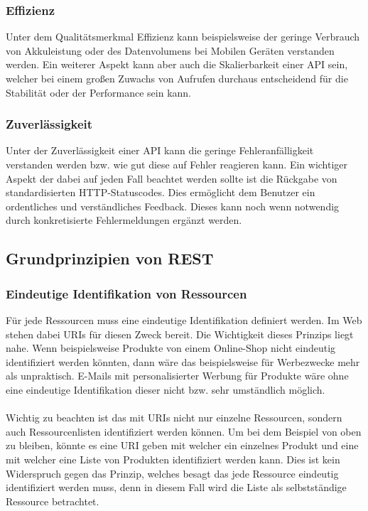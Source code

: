 \subsubsection{Effizienz}
Unter dem Qualitätsmerkmal Effizienz kann beispielsweise der geringe Verbrauch von Akkuleistung oder des Datenvolumens bei Mobilen Geräten verstanden werden. Ein weiterer Aspekt kann aber auch die Skalierbarkeit einer \gls{API} sein, welcher bei einem großen Zuwachs von Aufrufen durchaus entscheidend für die Stabilität oder der Performance sein kann.

\subsubsection{Zuverlässigkeit}
Unter der Zuverlässigkeit einer \gls{API} kann die geringe Fehleranfälligkeit verstanden werden bzw. wie gut diese auf Fehler reagieren kann. Ein wichtiger Aspekt der dabei auf jeden Fall beachtet werden sollte ist die Rückgabe von standardisierten HTTP-Statuscodes. Dies ermöglicht dem Benutzer ein ordentliches und verständliches Feedback. Dieses kann noch wenn notwendig durch konkretisierte Fehlermeldungen ergänzt werden.

\subsection{Grundprinzipien von REST}\label{sec:basePricipleREST}
\subsubsection{Eindeutige Identifikation von Ressourcen}
Für jede Ressourcen muss eine eindeutige Identifikation definiert werden. Im Web stehen dabei \glspl{URI} für diesen Zweck bereit. Die Wichtigkeit dieses Prinzips liegt nahe. Wenn beispielsweise Produkte von einem Online-Shop nicht eindeutig identifiziert werden könnten, dann wäre das beispielsweise für Werbezwecke mehr als unpraktisch. E-Mails mit personalisierter Werbung für Produkte wäre ohne eine eindeutige Identifikation dieser nicht bzw. sehr umständlich möglich.\\
\\
Wichtig zu beachten ist das mit \glspl{URI} nicht nur einzelne Ressourcen, sondern auch Ressourcenlisten identifiziert werden können. Um bei dem Beispiel von oben zu bleiben, könnte es eine \gls{URI} geben mit welcher ein einzelnes Produkt und eine mit welcher eine Liste von Produkten identifiziert werden kann. Dies ist kein Widerspruch gegen das Prinzip, welches besagt das jede Ressource eindeutig identifiziert werden muss, denn in diesem Fall wird die Liste als selbstständige Ressource betrachtet.

